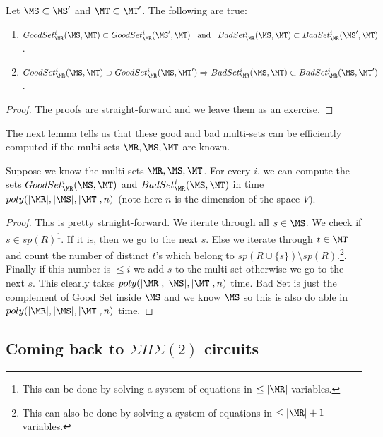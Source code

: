 \begin{lemma}\label{lemma:elementary}
 Let $\MS\subset \MS^\prime$ and $\MT\subset \MT^\prime$. The following are true:
 \begin{enumerate}
  \item $GoodSet^i_{\MR}(\MS,\MT) \subset GoodSet^i_{\MR}(\MS^\prime,\MT) \hspace{0.5em}\text{ and }\hspace{0.5em}
  BadSet^i_{\MR}(\MS,\MT) \subset BadSet^i_{\MR}(\MS^\prime,\MT)$.
  \item $GoodSet^i_{\MR}(\MS,\MT) \supset GoodSet^i_{\MR}(\MS,\MT^\prime) \Rightarrow 
  BadSet^i_{\MR}(\MS,\MT) \subset BadSet^i_{\MR}(\MS,\MT^\prime)$.
 \end{enumerate}
\end{lemma}
\begin{proof}
 The proofs are straight-forward and we leave them as an exercise.
\end{proof}
The next lemma tells us that these good and bad multi-sets can be efficiently computed if the multi-sets
$\MR,\MS,\MT$ are known.
\begin{lemma}
 Suppose we know the multi-sets $\MR,\MS,\MT$. For every $i$, we can compute the sets $GoodSet^i_\MR(\MS,\MT)$
 and $BadSet^i_\MR(\MS,\MT)$ in time $poly(|\MR|, |\MS|, |\MT|,n)$ (note here $n$ is the dimension of the space $V$).
\end{lemma}
\begin{proof}
 This is pretty straight-forward. We iterate through all $s\in \MS$. We check if $s\in sp(R)$\footnote{ This can be done
  by solving a system of equations in $\leq |\MR|$ variables. }. If it is, then we go to the next $s$. Else we iterate through
  $t\in \MT$ and count the number of distinct $t$'s which belong to $sp(R \cup \{s\})\setminus sp(R)$.\footnote{ This can also
  be done by solving a system of equations in $\leq |\MR|+1$ variables. }. Finally if this number is $\leq i$ we add $s$ to the multi-set otherwise
  we go to the next $s$. This clearly takes $poly(|\MR|,|\MS|,|\MT|,n)$ time. Bad Set is just the complement of Good Set 
  inside $\MS$ and we know $\MS$ so this is also do able in $poly(|\MR|,|\MS|,|\MT|,n)$ time.
\end{proof}


\subsection{Coming back to $\Sigma\Pi\Sigma(2)$ circuits}

